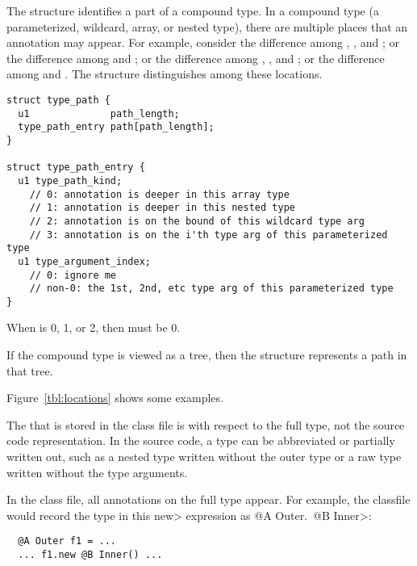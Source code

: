 \documentclass[10pt]{article}
\begin{document}
The  structure identifies a part of a compound type.
In a compound type (a parameterized, wildcard, array, or nested type),
there are multiple places that an annotation may appear.
For example, consider the difference among
,
, and
;
or the difference among
 and
;
or the difference among 
,
, and
;
or the difference among 
 and
.
The  structure distinguishes among these locations.

\begin{Verbatim}[samepage=true]
struct type_path {
  u1              path_length;
  type_path_entry path[path_length];
}

struct type_path_entry {
  u1 type_path_kind;
    // 0: annotation is deeper in this array type
    // 1: annotation is deeper in this nested type
    // 2: annotation is on the bound of this wildcard type arg
    // 3: annotation is on the i'th type arg of this parameterized type
  u1 type_argument_index;
    // 0: ignore me
    // non-0: the 1st, 2nd, etc type arg of this parameterized type
}
\end{Verbatim}


When  is 0, 1, or 2, then
 must be 0.

If the compound type is viewed as a tree, then 
the  structure represents a path in that tree.

Figure~\ref{tbl:locations} shows some examples.

The  that is stored in the class file is with respect to the full type, not the
source code representation.  In the source code, a type can be abbreviated
or partially written out, such as a nested type written without the outer
type or a raw type written without the type arguments.

In the class file, all annotations on the full type appear.  For example,
the classfile would record the type in this \<new> expression as
\<@A Outer.\ @B Inner>:

\preverbnegspace
\begin{Verbatim}
  @A Outer f1 = ...
  ... f1.new @B Inner() ...
\end{Verbatim}
\end{document}
